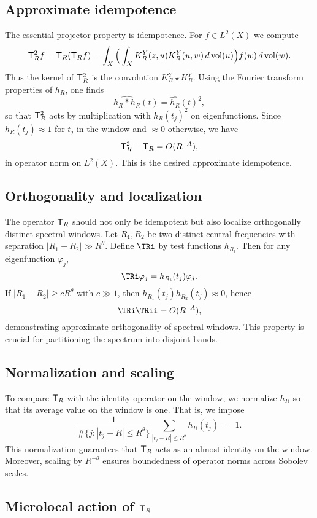 \subsection{Approximate idempotence}\label{subsec:proj-idempotence}

The essential projector property is idempotence. For $f\in L^2(X)$ we compute
\[
\mathsf{T}_R^2 f = \mathsf{T}_R(\mathsf{T}_R f) = \int_X \Big(\int_X K_R^Y(z,u)K_R^Y(u,w)\,d\operatorname{vol}(u)\Big) f(w)\,d\operatorname{vol}(w).
\]
Thus the kernel of $\mathsf{T}_R^2$ is the convolution $K_R^Y \star K_R^Y$. Using the Fourier transform properties of $h_R$, one finds
\[
\widehat{h_R * h_R}(t) = \widehat{h_R}(t)^2,
\]
so that $\mathsf{T}_R^2$ acts by multiplication with $h_R(t_j)^2$ on eigenfunctions. Since $h_R(t_j)\approx 1$ for $t_j$ in the window and $\approx 0$ otherwise, we have
\[
\mathsf{T}_R^2 - \mathsf{T}_R = O(R^{-\!A}),
\]
in operator norm on $L^2(X)$. This is the desired approximate idempotence.

\subsection{Orthogonality and localization}\label{subsec:proj-orthogonality}

The operator $\mathsf{T}_R$ should not only be idempotent but also localize orthogonally distinct spectral windows. Let $R_1,R_2$ be two distinct central frequencies with separation $|R_1-R_2|\gg R^\theta$. Define $\TRi$ by test functions $h_{R_i}$. Then for any eigenfunction $\varphi_j$,
\[
\TRi\varphi_j = h_{R_i}(t_j)\varphi_j.
\]
If $|R_1-R_2|\ge c R^\theta$ with $c\gg 1$, then $h_{R_1}(t_j)h_{R_2}(t_j)\approx 0$, hence
\[
\TRi\TRii = O(R^{-\!A}),
\]
demonstrating approximate orthogonality of spectral windows. This property is crucial for partitioning the spectrum into disjoint bands.

\subsection{Normalization and scaling}\label{subsec:proj-normalization}

To compare $\mathsf{T}_R$ with the identity operator on the window, we normalize $h_R$ so that its average value on the window is one. That is, we impose
\[
\frac{1}{\#\{j:|t_j-R|\le R^\theta\}} \sum_{|t_j-R|\le R^\theta} h_R(t_j) \;=\; 1.
\]
This normalization guarantees that $\mathsf{T}_R$ acts as an almost-identity on the window. Moreover, scaling by $R^{-\theta}$ ensures boundedness of operator norms across Sobolev scales.

\subsection{Microlocal action of $\mathsf{T}_R$}\label{subsec:proj-micro}

